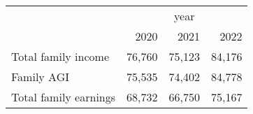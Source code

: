 \documentclass{article}
\begin{document}
\begin{tabular}{llll}
\cline{1-4}
\multicolumn{1}{c}{} &
  \multicolumn{3}{|c}{year} \\
\multicolumn{1}{c}{} &
  \multicolumn{1}{|r}{2020} &
  \multicolumn{1}{r}{2021} &
  \multicolumn{1}{r}{2022} \\
\cline{1-4}
\multicolumn{1}{l}{Total family income} &
  \multicolumn{1}{|r}{76,760} &
  \multicolumn{1}{r}{75,123} &
  \multicolumn{1}{r}{84,176} \\
\multicolumn{1}{l}{Family AGI} &
  \multicolumn{1}{|r}{75,535} &
  \multicolumn{1}{r}{74,402} &
  \multicolumn{1}{r}{84,778} \\
\multicolumn{1}{l}{Total family earnings} &
  \multicolumn{1}{|r}{68,732} &
  \multicolumn{1}{r}{66,750} &
  \multicolumn{1}{r}{75,167} \\
\cline{1-4}
\end{tabular}
\end{document}
